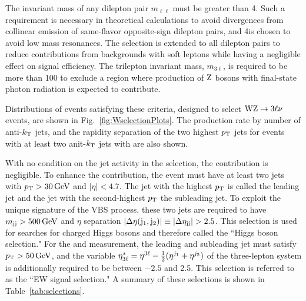 The invariant mass of any dilepton
pair $m_{\ell\ell}$ must be greater than 4\GeV.
Such a requirement is necessary in theoretical calculations to avoid divergences 
from collinear emission of same-flavor opposite-sign 
dilepton pairs, and 4\GeV is chosen to avoid low mass resonances.
The selection is extended to all dilepton pairs to 
reduce contributions from backgrounds with soft leptons while having a negligible effect on signal efficiency.
The trilepton invariant mass, $m_{3\ell}$, is required to be more than 100\GeV
to exclude a region where production of $\mathrm{Z}$ bosons with final-state photon radiation
is expected to contribute.

Distributions of events satisfying these criteria, designed to select
$\mathrm{W}\mathrm{Z}\rightarrow 3\ell\nu$ events, are shown in Fig.~\ref{fig:WselectionPlots}.
The \WZ production rate by
number of anti-$k_{\mathrm{T}}$ jets, and the rapidity separation of the two
highest $p_{\mathrm{T}}$ jets for events with at least two anit-$k_{\mathrm{T}}$ jets
with are also shown.

With no condition on the jet activity in the selection,
the \EWWZ contribution is negligible. To enhance the \EWWZ contribution,
the event must have at least two jets with $p_{\mathrm{T}} > 30\,\text{Ge\hspace{-.08em}V}$ and $|\eta| < 4.7$. 
The jet with the highest $p_{\mathrm{T}}$ is 
called the leading jet and the jet with the second-highest $p_{\mathrm{T}}$ the subleading jet. 
To exploit the unique signature of the VBS process, these two jets are required to have
$m_{\mathrm{jj}} > 500\,\text{Ge\hspace{-.08em}V}$ and $\eta$ separation 
$\left|\Delta\eta(\mathrm{j}_{1}, \mathrm{j}_{2}) \right| \equiv \left|\Delta\eta_{\mathrm{jj}} \right| > 2.5$.
This selection 
is used for searches for charged Higgs bosons and therefore called the ``Higgs boson selection."
For the \WZjj and \EWWZ measurement,
the leading and subleading jet must satisfy $p_{\mathrm{T}} > 50\,\text{Ge\hspace{-.08em}V}$, and
the variable $\eta^{*}_{3\ell} = \eta^{3\ell} - \frac{1}{2}(\eta^{j_{1}} + \eta^{j_{2}})$
of the three-lepton system is additionally required to be between $-2.5$ and 2.5. This selection is
referred to as the ``EW signal selection." 
A summary of these selections is shown in Table~\ref{tab:selections}. 


